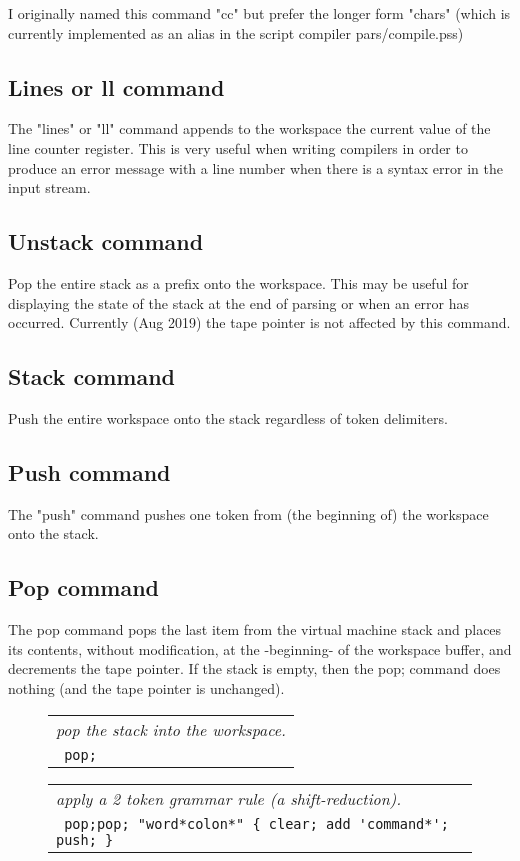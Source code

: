 \documentclass[a4paper,12pt]{article}
\begin{document}
  I originally named this command "cc" but prefer the longer
  form "chars" (which is currently implemented as an alias in
  the script compiler pars/compile.pss)

\subsection{Lines or ll command}

  The "lines" or "ll" command appends to the workspace the
  current value of the line counter register. This is very useful
  when writing compilers in order to produce an error message
  with a line number when there is a syntax error in the input stream.

\subsection{Unstack command}

  Pop the entire stack as a prefix onto the workspace. This may be
  useful for displaying the state of the stack at the end of
  parsing or when an error has occurred. Currently (Aug 2019) the
  tape pointer is not affected by this command.

\subsection{Stack command}

  Push the entire workspace onto the stack regardless of token
  delimiters.

\subsection{Push command}

  The "push" command pushes one token from (the beginning of) the
  workspace onto the stack.

\subsection{Pop command}

  The pop command pops the last item from the virtual machine stack
  and places its contents, without modification, at the -beginning-
  of the workspace buffer, and decrements the tape pointer. If the
  stack is empty, then the pop; command does nothing (and the tape
  pointer is unchanged).
 \begin{figure}
 \begin{tabular}{ l }
 \emph{ pop the stack into the workspace. } \\ 
 \verb| pop; |
 \end{tabular} 
 \end{figure}
 \begin{figure}
 \begin{tabular}{ l }
 \emph{ apply a 2 token grammar rule (a shift-reduction). } \\ 
 \verb| pop;pop; "word*colon*" { clear; add 'command*'; push; } |
 \end{tabular} 
 \end{figure}
\end{document}

